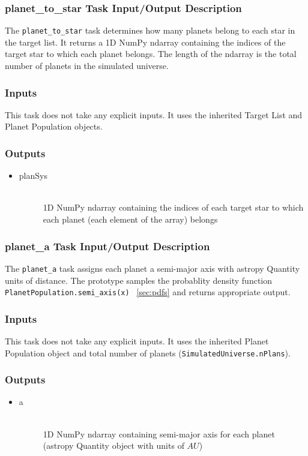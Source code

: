 \documentclass[cleanfoot]{asme2ej}
\begin{document}
\subsubsection{planet\_to\_star Task Input/Output Description} \label{sec:planettostartask}
The \verb+planet_to_star+ task determines how many planets belong to each star in the target list.  It returns a 1D NumPy ndarray containing the indices of the target star to which each planet belongs.  The length of the ndarray is the total number of planets in the simulated universe.

\subsubsection*{Inputs}
This task does not take any explicit inputs.  It uses the inherited Target List and Planet Population objects.

\subsubsection*{Outputs}
\begin{itemize}
    \item 
    \begin{description}
        \item[planSys] \hfill \\
        1D NumPy ndarray containing the indices of each target star to which each planet (each element of the array) belongs
    \end{description}
\end{itemize}

\subsubsection{planet\_a Task Input/Output Description} \label{sec:planetatask}
The \verb+planet_a+ task assigns each planet a semi-major axis with astropy Quantity units of distance.  The prototype samples the probablity density function \verb+PlanetPopulation.semi_axis(x)+ ~\ref{sec:pdfs} and returns appropriate output.

\subsubsection*{Inputs}
This task does not take any explicit inputs.  It uses the inherited Planet Population object and total number of planets (\verb+SimulatedUniverse.nPlans+).

\subsubsection*{Outputs}
\begin{itemize}
    \item 
    \begin{description}
        \item[a] \hfill \\
        1D NumPy ndarray containing semi-major axis for each planet (astropy Quantity object with units of $ AU $)
    \end{description}
\end{itemize}
\end{document}
